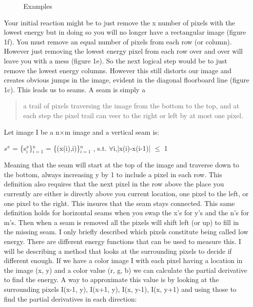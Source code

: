 \documentclass{sig-alternate}
\begin{document}
\begin{figure}
\centering
{}
\caption{Examples}
\label{fig:singleColumnFigure}
\end{figure}

Your initial reaction might be to just remove the x number of pixels with the lowest energy but in doing so you will no longer have a rectangular image (figure 1f)\cite{Avidan:2007:SCC:1276377.1276390}. You must remove an equal number of pixels from each row (or column). However just removing the lowest energy pixel from each row over and over will leave you with a mess (figure 1e)\cite{Avidan:2007:SCC:1276377.1276390}. So the next logical step would be to just remove the lowest energy columns. However this still distorts our image and creates obvious jumps in the image, evident in the diagonal floorboard line (figure 1c)\cite{Avidan:2007:SCC:1276377.1276390}. This leads us to seams. A seam is simply a \begin{quote}a trail of pixels traversing the image from the bottom to the top, and at each step the pixel trail can veer to the right or left by at most one pixel.\cite{blogPost}\end{quote}
Let image I be a n$\times$m image and a vertical seam is: 


$s^{x}$ = \{s$_i^x$\}$_{i=1}^{n}$ = \{(x(i),i)\}$_{i=1}^n$ , s.t. $\forall$i,|x(i)-x(i-1)| $\leq$ 1 
\cite{Avidan:2007:SCC:1276377.1276390}



Meaning that the seam will start at the top of the image and traverse down to the bottom, always increasing y by 1 to include a pixel in each row. This definition also requires that the next pixel in the row above the place you currently are either is directly above you current location, one pixel to the left, or one pixel to the right. This insures that the seam stays connected. This same definition holds for horizontal seams when you swap the x’s for y’s and the n’s for m’s. Then when a seam is removed all the pixels will shift left (or up) to fill in the missing seam. 
I only briefly described which pixels constitute being called low energy. There are different energy functions that can be used to measure this. I will be describing a method that looks at the surrounding pixels to decide if different enough.  If we have a color image I with each pixel having a location in the image (x, y) and a color value (r, g, b) we can calculate the partial derivative  to find the energy. A way to approximate this value is by looking at the surrounding pixels I(x-1, y), I(x+1, y), I(x, y-1), I(x, y+1) and using those to find the partial derivatives in each direction:
\end{document}
